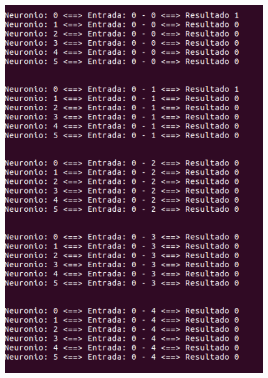 \documentclass[hidelinks,12pt]{article}
\begin{document}
		\begin{figure}[!h]
			\centering
			\includegraphics[scale=0.5]{Figures/E3S0P1R.png}
		\end{figure}
		
\end{document}
